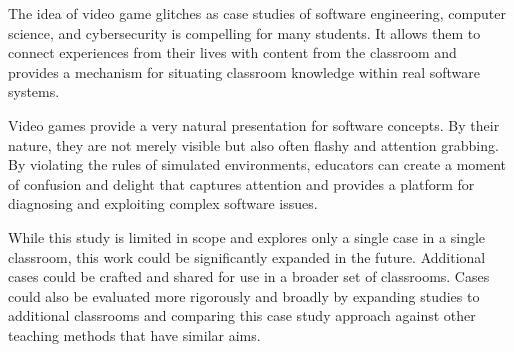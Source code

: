 \documentclass[letterpaper]{article}
\begin{document}
The idea of video game glitches as case studies of software engineering, computer science, and cybersecurity is compelling for many students. It allows them to connect experiences from their lives with content from the classroom and provides a mechanism for situating classroom knowledge within real software systems.

Video games provide a very natural presentation for software concepts. By their nature, they are not merely visible but also often flashy and attention grabbing. By violating the rules of simulated environments, educators can create a moment of confusion and delight that captures attention and provides a platform for diagnosing and exploiting complex software issues.

While this study is limited in scope and explores only a single case in a single classroom, this work could be significantly expanded in the future. Additional cases could be crafted and shared for use in a broader set of classrooms. Cases could also be evaluated more rigorously and broadly by expanding studies to additional classrooms and comparing this case study approach against other teaching methods that have similar aims.

%
%

\printbibliography
\end{document}
